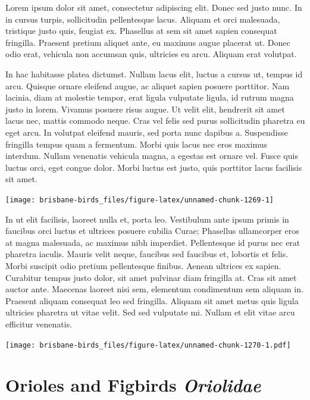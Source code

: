 \documentclass[]{book}
\let\origfigure\figure
\let\endorigfigure\endfigure
\renewenvironment{figure}[1][2] {
  \expandafter\origfigure\expandafter[H]
} {
  \endorigfigure
}
\begin{document}
Lorem ipsum dolor sit amet, consectetur adipiscing elit. Donec sed justo
nunc. In in cursus turpis, sollicitudin pellentesque lacus. Aliquam et
orci malesuada, tristique justo quis, feugiat ex. Phasellus at sem sit
amet sapien consequat fringilla. Praesent pretium aliquet ante, eu
maximus augue placerat ut. Donec odio erat, vehicula non accumsan quis,
ultricies eu arcu. Aliquam erat volutpat.

In hac habitasse platea dictumst. Nullam lacus elit, luctus a cursus ut,
tempus id arcu. Quisque ornare eleifend augue, ac aliquet sapien posuere
porttitor. Nam lacinia, diam at molestie tempor, erat ligula vulputate
ligula, id rutrum magna justo in lorem. Vivamus posuere risus augue. Ut
velit elit, hendrerit sit amet lacus nec, mattis commodo neque. Cras vel
felis sed purus sollicitudin pharetra eu eget arcu. In volutpat eleifend
mauris, sed porta nunc dapibus a. Suspendisse fringilla tempus quam a
fermentum. Morbi quis lacus nec eros maximus interdum. Nullam venenatis
vehicula magna, a egestas est ornare vel. Fusce quis luctus orci, eget
congue dolor. Morbi luctus est justo, quis porttitor lacus facilisis sit
amet.

\begin{figure}
\texttt{[image: brisbane-birds\_files/figure-latex/unnamed-chunk-1269-1]} \caption{insert figure caption}\label{fig:unnamed-chunk-1269}
\end{figure}

In ut elit facilisis, laoreet nulla et, porta leo. Vestibulum ante ipsum
primis in faucibus orci luctus et ultrices posuere cubilia Curae;
Phasellus ullamcorper eros at magna malesuada, ac maximus nibh
imperdiet. Pellentesque id purus nec erat pharetra iaculis. Mauris velit
neque, faucibus sed faucibus et, lobortis et felis. Morbi suscipit odio
pretium pellentesque finibus. Aenean ultrices ex sapien. Curabitur
tempus justo dolor, sit amet pulvinar diam fringilla at. Cras sit amet
auctor ante. Maecenas laoreet nisi sem, elementum condimentum sem
aliquam in. Praesent aliquam consequat leo sed fringilla. Aliquam sit
amet metus quis ligula ultricies pharetra ut vitae velit. Sed sed
vulputate mi. Nullam et elit vitae arcu efficitur venenatis.

\begin{figure}
\centering
\texttt{[image: brisbane-birds\_files/figure-latex/unnamed-chunk-1270-1.pdf]}
\caption{\label{fig:unnamed-chunk-1270}insert figure caption}
\end{figure}

\chapter{\texorpdfstring{Orioles and Figbirds
\emph{Oriolidae}}{Orioles and Figbirds Oriolidae}}\label{orioles-and-figbirds-oriolidae}
\end{document}
